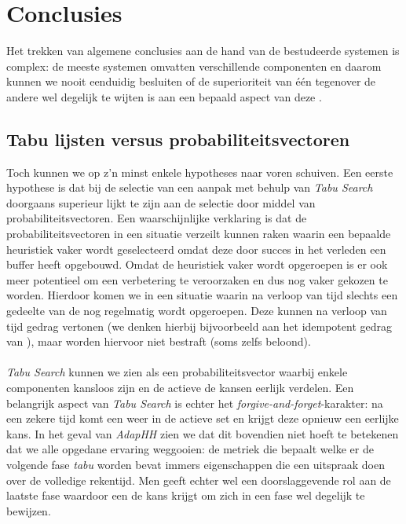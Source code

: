 \section{Conclusies}
Het trekken van algemene conclusies aan de hand van de bestudeerde systemen is complex: de meeste systemen omvatten verschillende componenten en daarom kunnen we nooit eenduidig besluiten of de superioriteit van \'e\'en \abhh{} tegenover de andere wel degelijk te wijten is aan een bepaald aspect van deze \abhh{}.

\subsection{Tabu lijsten versus probabiliteitsvectoren}
Toch kunnen we op z'n minst enkele hypotheses naar voren schuiven. Een eerste hypothese is dat bij de selectie van \abllhn{} een aanpak met behulp van \emph{Tabu Search} doorgaans superieur lijkt te zijn aan de selectie door middel van probabiliteitsvectoren. Een waarschijnlijke verklaring is dat de probabiliteitsvectoren in een situatie verzeilt kunnen raken waarin een bepaalde heuristiek vaker wordt geselecteerd omdat deze door succes in het verleden een buffer heeft opgebouwd. Omdat de heuristiek vaker wordt opgeroepen is er ook meer potentieel om een verbetering te veroorzaken en dus nog vaker gekozen te worden. Hierdoor komen we in een situatie waarin na verloop van tijd slechts een gedeelte van de \abllhn{} nog regelmatig wordt opgeroepen. Deze \abllhn{} kunnen na verloop van tijd \abieff{} gedrag vertonen (we denken hierbij bijvoorbeeld aan het idempotent gedrag van \abls{}), maar worden hiervoor niet bestraft (soms zelfs beloond).

\paragraph{}
\emph{Tabu Search} kunnen we zien als een probabiliteitsvector waarbij enkele componenten kansloos zijn en de actieve \abhn{} de kansen eerlijk verdelen. Een belangrijk aspect van \emph{Tabu Search} is echter het \emph{forgive-and-forget}-karakter: na een zekere tijd komt een \abh{} weer in de actieve set en krijgt deze opnieuw een eerlijke kans. In het geval van \emph{AdapHH} zien we dat dit bovendien niet hoeft te betekenen dat we alle opgedane ervaring weggooien: de metriek die bepaalt welke \abhn{} er de volgende fase \emph{tabu} worden bevat immers eigenschappen die een uitspraak doen over de volledige rekentijd. Men geeft echter wel een doorslaggevende rol aan de laatste fase waardoor een \abh{} de kans krijgt om zich in een fase wel degelijk te bewijzen.

